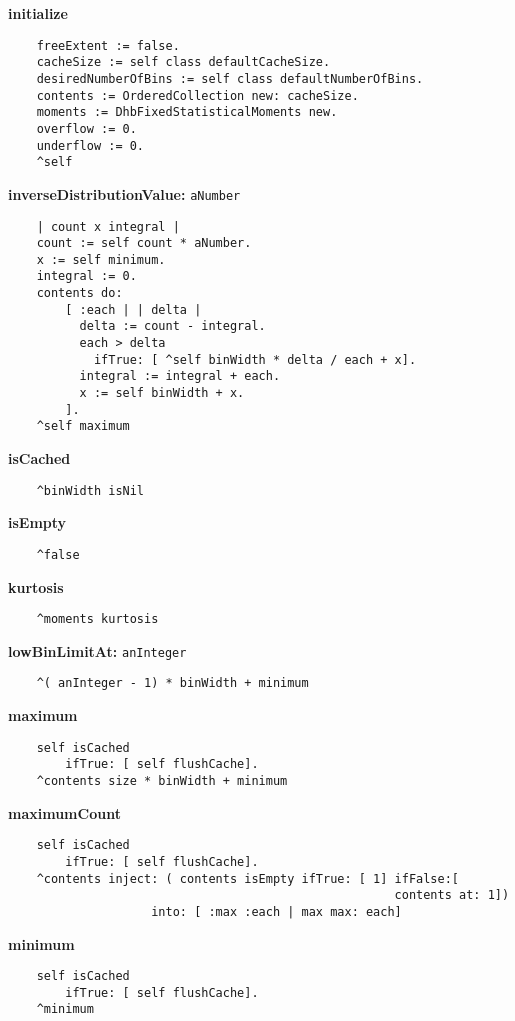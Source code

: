 {\bf initialize}
\begin{verbatim}
    freeExtent := false.
    cacheSize := self class defaultCacheSize.
    desiredNumberOfBins := self class defaultNumberOfBins.
    contents := OrderedCollection new: cacheSize.
    moments := DhbFixedStatisticalMoments new.
    overflow := 0.
    underflow := 0.
    ^self

\end{verbatim}
{\bf inverseDistributionValue:} {\tt aNumber}
\begin{verbatim}
    | count x integral |
    count := self count * aNumber.
    x := self minimum.
    integral := 0.
    contents do:
        [ :each | | delta |
          delta := count - integral.
          each > delta
            ifTrue: [ ^self binWidth * delta / each + x].
          integral := integral + each.
          x := self binWidth + x.
        ].
    ^self maximum

\end{verbatim}
{\bf isCached}
\begin{verbatim}
    ^binWidth isNil

\end{verbatim}
{\bf isEmpty}
\begin{verbatim}
    ^false

\end{verbatim}
{\bf kurtosis}
\begin{verbatim}
    ^moments kurtosis

\end{verbatim}
{\bf lowBinLimitAt:} {\tt anInteger}
\begin{verbatim}
    ^( anInteger - 1) * binWidth + minimum

\end{verbatim}
{\bf maximum}
\begin{verbatim}
    self isCached
        ifTrue: [ self flushCache].
    ^contents size * binWidth + minimum

\end{verbatim}
{\bf maximumCount}
\begin{verbatim}
    self isCached
        ifTrue: [ self flushCache].
    ^contents inject: ( contents isEmpty ifTrue: [ 1] ifFalse:[ 
                                                      contents at: 1])
                    into: [ :max :each | max max: each]

\end{verbatim}
{\bf minimum}
\begin{verbatim}
    self isCached
        ifTrue: [ self flushCache].
    ^minimum

\end{verbatim}
